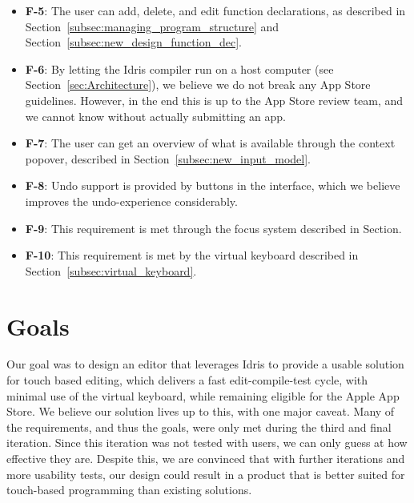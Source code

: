 \begin{itemize}
	\item \textbf{F-5}: The user can add, delete, and edit function declarations, as described in Section~\ref{subsec:managing_program_structure} and Section~\ref{subsec:new_design_function_dec}.
	\item \textbf{F-6}: By letting the Idris compiler run on a host computer (see Section~\ref{sec:Architecture}), we believe we do not break any App Store guidelines. However, in the end this is up to the App Store review team, and we cannot know without actually submitting an app.
	\item \textbf{F-7}: The user can get an overview of what is available through the context popover, described in Section~\ref{subsec:new_input_model}.
	\item \textbf{F-8}: Undo support is provided by buttons in the interface, which we believe improves the undo-experience considerably.
	\item \textbf{F-9}: This requirement is met through the focus system described in Section.
	\item \textbf{F-10}: This requirement is met by the virtual keyboard described in Section~\ref{subsec:virtual_keyboard}.
\end{itemize}

\section{Goals}
Our goal was to design an editor that leverages Idris to provide a usable solution for touch based editing, which delivers a fast edit-compile-test cycle, with minimal use of the virtual keyboard, while remaining eligible for the Apple App Store.
We believe our solution lives up to this, with one major caveat. Many of the requirements, and thus the goals, were only met during the third and final iteration.
Since this iteration was not tested with users, we can only guess at how effective they are.
Despite this, we are convinced that with further iterations and more usability tests, our design could result in a product that is better suited for touch-based programming than existing solutions.
